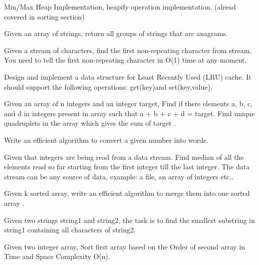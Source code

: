 {\begin{exercise}
\newpage
{}
\begin{compactenum}
    \item Min/Max Heap Implementation, heapify operation implementation. (alread covered in sorting section)
    \item Given an array of strings, return all groups of strings that are anagrams.
    \item Given a stream of characters, find the first non-repeating character from stream. You need to tell the first non-repeating character in O(1) time at any moment.
    \item Design and implement a data structure for Least Recently Used (LRU) cache. It should support the following operations: get(key)and set(key,value).
    \item Given an array  of n integers and an integer target, Find if there elements a, b, c, and d in integers present in array  such that a + b + c + d = target. Find unique quadruplets in the array which gives the sum of target .
    \item Write an efficient algorithm to convert a given number into words. 
    \item Given that integers are being read from a data stream. Find median of all the elements read so far starting from the first integer till the last integer. The data stream can be any source of data, example: a file, an array of integers etc..
    \item Given k sorted array, write an efficient algorithm to merge them into one sorted array .
    \item Given two strings string1 and string2, the task is to find the smallest substring in string1 containing all characters of string2.
    \item Given two integer array, Sort first array based on the Order of second array in Time and Space Complexity O(n).
\end{compactenum}


\end{exercise}}

